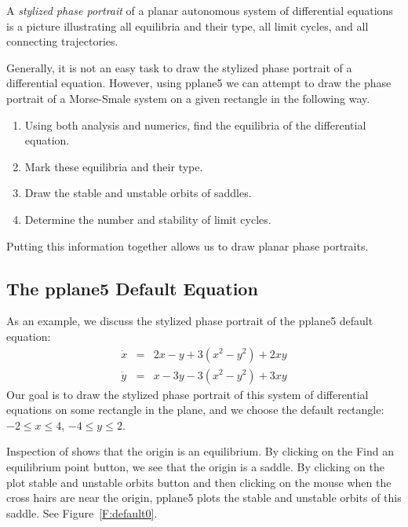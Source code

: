 \documentclass{ximera}
\begin{document}
\begin{Def} \label{D:stylized}
A {\em stylized phase portrait\/} of a planar autonomous system
of differential equations is a picture illustrating all
equilibria and their type, all limit cycles, and all connecting
trajectories.
\end{Def}

Generally, it is not an easy task to draw the stylized phase
portrait of a differential equation.  However, using {\sf pplane5\/} 
we can attempt to draw the phase portrait of a
Morse-Smale system on a given rectangle in the following way.
\begin{enumerate}
\item Using both analysis and numerics, find the equilibria of
the differential equation.
\item Mark these equilibria and their type.  
\item Draw the stable and unstable orbits of saddles.  
\item Determine the number and stability of limit cycles.  
\end{enumerate}
Putting this information together allows us to draw planar phase
portraits.

\subsection*{The {\sf pplane5} Default Equation}

As an example, we discuss the stylized phase portrait of the 
{\sf pplane5} default equation:
\begin{equation}  \label{e:default}
\begin{array}{rcl}
\dot{x} & = & 2x-y+3(x^2-y^2)+2xy \\
\dot{y} & = & x-3y-3(x^2-y^2)+3xy
\end{array}
\end{equation} 
Our goal is to draw the stylized phase portrait of this system
of differential equations on some rectangle in the plane, and we
choose the default rectangle: $-2\leq x\leq 4$, $-4\leq y\leq 2$.

Inspection of  shows that the origin 
is an equilibrium.  By clicking on the {\sf Find an equilibrium point}
button, we see that the origin is a saddle.  By clicking on the
{\sf plot stable and unstable orbits} button and then clicking
on the mouse when the cross hairs are near the origin, {\sf
pplane5} plots the stable and unstable orbits of this saddle.
See Figure~\ref{F:default0}.
\end{document}
